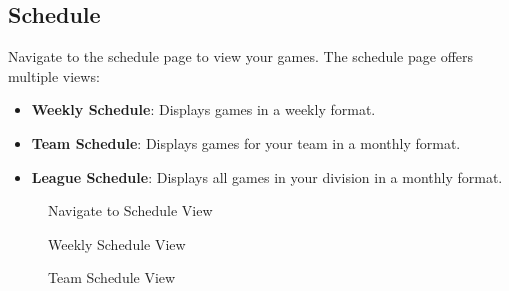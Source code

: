 \documentclass{article}
\begin{document}
\subsection{Schedule}
Navigate to the schedule page to view your games. The schedule page offers multiple views:

\begin{itemize}
    \item \textbf{Weekly Schedule}: Displays games in a weekly format.
    \item \textbf{Team Schedule}: Displays games for your team in a monthly format.
    \item \textbf{League Schedule}: Displays all games in your division in a monthly format.
\end{itemize}

\begin{figure}[H]
    \centering
    \caption{Navigate to Schedule View}
\end{figure}

\begin{figure}[H]
    \centering
    \caption{Weekly Schedule View}
\end{figure}

\begin{figure}[H]
    \centering
    \caption{Team Schedule View}
\end{figure}
\end{document}
